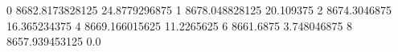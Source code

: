 0 8682.8173828125 24.8779296875
1 8678.048828125 20.109375
2 8674.3046875 16.365234375
4 8669.166015625 11.2265625
6 8661.6875 3.748046875
8 8657.939453125 0.0
